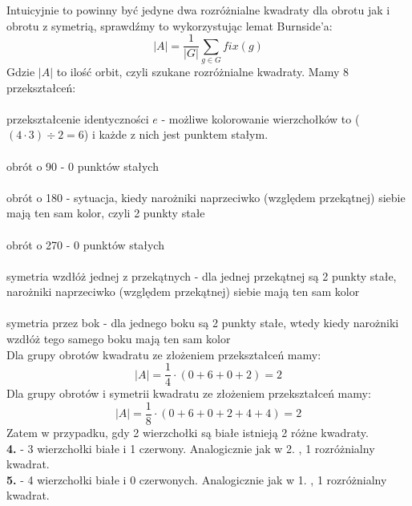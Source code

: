 \documentclass[a4paper]{article}
\begin{document}
\begin{adjustwidth}{30pt}{30pt}
\begin{center}
\end{center}
Intuicyjnie to powinny być jedyne dwa rozróżnialne kwadraty dla obrotu jak i obrotu z symetrią, sprawdźmy to wykorzystując lemat Burnside'a:\\
$$|A| = \frac{1}{|G|} \sum_{g \in G}fix(g) $$
Gdzie $|A|$ to ilość orbit, czyli szukane rozróżnialne kwadraty. Mamy 8 przekształceń:\\
\\ przekształcenie identyczności $e$ - możliwe kolorowanie wierzchołków to ($ (4\cdot 3) \div 2 = 6 $) i każde z nich jest punktem stałym.\\
\\ obrót o 90 \textdegree - 0 punktów stałych \\
\\ obrót o 180 \textdegree - sytuacja, kiedy narożniki naprzeciwko (względem przekątnej) siebie mają ten sam kolor, czyli 2 punkty stałe \\
\\ obrót o 270 \textdegree - 0 punktów stałych \\
\\ symetria wzdłóż jednej z przekątnych - dla jednej przekątnej są 2 punkty stałe, narożniki naprzeciwko (względem przekątnej) siebie mają ten sam kolor \\ 
\\ symetria przez bok - dla jednego boku są 2 punkty stałe, wtedy kiedy narożniki wzdłóż tego samego boku mają ten sam kolor \\
Dla grupy obrotów kwadratu ze złożeniem przekształceń mamy:
$$|A| = \frac{1}{4} \cdot (0 + 6 + 0 + 2) = 2$$
Dla grupy obrotów i symetrii kwadratu ze złożeniem przekształceń mamy:
$$|A| = \frac{1}{8} \cdot (0 + 6 + 0 + 2 + 4 + 4) = 2$$
Zatem w przypadku, gdy 2 wierzchołki są białe istnieją 2 różne kwadraty.\\
\textbf{4.} - 3 wierzchołki białe i 1 czerwony. Analogicznie jak w 2. , 1 rozróżnialny kwadrat.\\
\textbf{5.} - 4 wierzchołki białe i 0 czerwonych. Analogicznie jak w 1. , 1 rozróżnialny kwadrat.
\end{adjustwidth}
\end{document}
